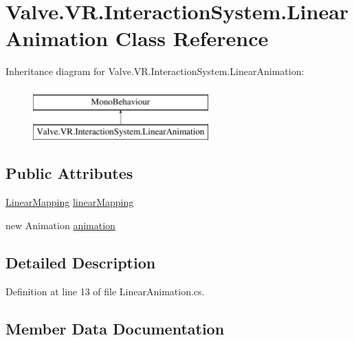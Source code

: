 \hypertarget{class_valve_1_1_v_r_1_1_interaction_system_1_1_linear_animation}{}\section{Valve.\+V\+R.\+Interaction\+System.\+Linear\+Animation Class Reference}
\label{class_valve_1_1_v_r_1_1_interaction_system_1_1_linear_animation}
Inheritance diagram for Valve.\+V\+R.\+Interaction\+System.\+Linear\+Animation\+:\begin{figure}[H]
\begin{center}
\leavevmode
\includegraphics[height=2.000000cm]{class_valve_1_1_v_r_1_1_interaction_system_1_1_linear_animation}
\end{center}
\end{figure}
\subsection*{Public Attributes}
\begin{DoxyCompactItemize}
\item 
\mbox{\hyperlink{class_valve_1_1_v_r_1_1_interaction_system_1_1_linear_mapping}{Linear\+Mapping}} \mbox{\hyperlink{class_valve_1_1_v_r_1_1_interaction_system_1_1_linear_animation_ac3554c09dd78ca72b877714509e6296c}{linear\+Mapping}}
\item 
new Animation \mbox{\hyperlink{class_valve_1_1_v_r_1_1_interaction_system_1_1_linear_animation_ae0db8b4277eef76e26a0f41e965ce41a}{animation}}
\end{DoxyCompactItemize}


\subsection{Detailed Description}


Definition at line 13 of file Linear\+Animation.\+cs.



\subsection{Member Data Documentation}
\mbox{\label{class_valve_1_1_v_r_1_1_interaction_system_1_1_linear_animation_ae0db8b4277eef76e26a0f41e965ce41a}} 
